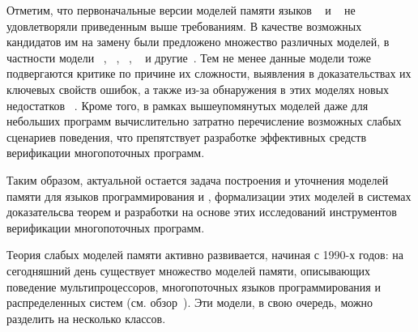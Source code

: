 Отметим, что первоначальные версии моделей памяти языков
\CPP~\autocite{Batty-al:POPL11} и \Java~\autocite{Manson-al:POPL05}
не удовлетворяли приведенным выше требованиям. 
В качестве возможных кандидатов им на замену были предложено множество различных моделей,
в частности модели \Wkm~\autocite{Chakraborty-Vafeiadis:POPL19}, \Prm~\autocite{Kang-al:POPL17}, 
\MRD~\autocite{Paviotti-al:ESOP20}, \PwT~\autocite{Jagadeesan-al:OOPSLA2020,Jeffrey-al:POPL2022}
и другие~\autocite{Jeffrey-Riely:LICS16, PichonPharabod-Sewell:POPL16, Paviotti-al:ESOP20}.
Тем не менее данные модели тоже подвергаются критике по причине их сложности,
выявления в доказательствах их ключевых свойств ошибок,
а также из-за обнаружения в этих моделях новых недостатков%
~\autocite{Paviotti-al:ESOP20,Jagadeesan-al:OOPSLA2020,Lee-al:PLDI20,Cho-al:PLDI21}.
Кроме того, в рамках вышеупомянутых моделей даже для небольших программ
вычислительно затратно перечисление возможных слабых сценариев поведения,
что препятствует разработке эффективных средств верификации многопоточных программ.

Таким образом, актуальной остается задача построения и уточнения 
моделей памяти для языков программирования \CPP и \Java,
формализации этих моделей в системах доказательсва теорем
и разработки на основе этих исследований инструментов верификации многопоточных программ.

{\progress}

Теория слабых моделей памяти активно развивается, начиная с 1990-х годов: 
на сегодняшний день существует множество моделей памяти, 
описывающих поведение мультипроцессоров, 
многопоточных языков программирования и распределенных систем 
(см. обзор~\cite{Moiseenko-al:PCS21}). 
Эти модели, в свою очередь, можно разделить на несколько классов.

